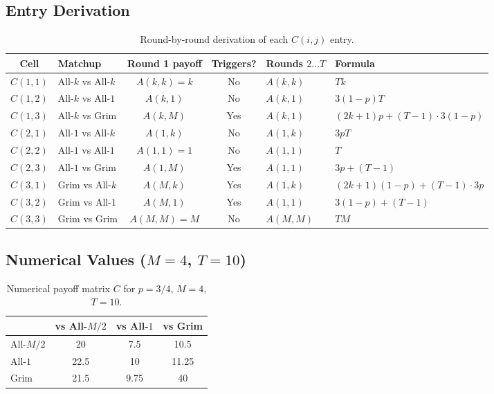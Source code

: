 \documentclass[12pt,a4paper]{article}
\begin{document}
\subsection{Entry Derivation}

\begin{table}[H]
\centering
\caption{Round-by-round derivation of each $C(i,j)$ entry.}
\label{tab:C_derivation}
\small
\begin{tabular}{clccll}
\toprule
Cell & Matchup & Round 1 payoff & Triggers? & Rounds $2\ldots T$ & Formula \\
\midrule
$C(1,1)$ & All-$k$ vs All-$k$    & $A(k,k)=k$ & No  & $A(k,k)$      & $Tk$ \\
$C(1,2)$ & All-$k$ vs All-$1$    & $A(k,1)$   & No  & $A(k,1)$      & $3(1-p)T$ \\
$C(1,3)$ & All-$k$ vs Grim       & $A(k,M)$   & Yes & $A(k,1)$      & $(2k+1)p+(T-1)\cdot 3(1-p)$ \\
$C(2,1)$ & All-$1$ vs All-$k$    & $A(1,k)$   & No  & $A(1,k)$      & $3pT$ \\
$C(2,2)$ & All-$1$ vs All-$1$    & $A(1,1)=1$ & No  & $A(1,1)$      & $T$ \\
$C(2,3)$ & All-$1$ vs Grim       & $A(1,M)$   & Yes & $A(1,1)$      & $3p+(T-1)$ \\
$C(3,1)$ & Grim vs All-$k$       & $A(M,k)$   & Yes & $A(1,k)$      & $(2k+1)(1-p)+(T-1)\cdot 3p$ \\
$C(3,2)$ & Grim vs All-$1$       & $A(M,1)$   & Yes & $A(1,1)$      & $3(1-p)+(T-1)$ \\
$C(3,3)$ & Grim vs Grim          & $A(M,M)=M$ & No  & $A(M,M)$      & $TM$ \\
\bottomrule
\end{tabular}
\end{table}

\subsection{Numerical Values ($M=4$, $T=10$)}

\begin{table}[H]
\centering
\caption{Numerical payoff matrix $C$ for $p=3/4$, $M=4$, $T=10$.}
\label{tab:C_p075}
\begin{tabular}{lccc}
\toprule
           & vs All-$M/2$ & vs All-$1$ & vs Grim \\
\midrule
All-$M/2$  & 20    & 7.5   & 10.5   \\
All-$1$    & 22.5  & 10    & 11.25  \\
Grim       & 21.5  & 9.75  & 40     \\
\bottomrule
\end{tabular}
\end{table}
\end{document}
